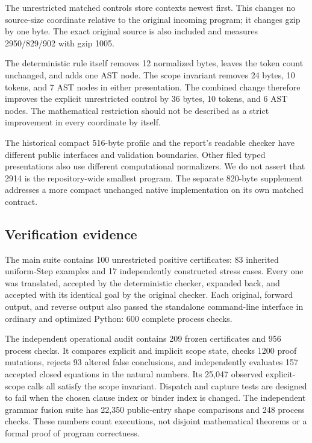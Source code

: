 \documentclass[11pt,letterpaper]{article}
\theoremstyle{definition}
\begin{document}

The unrestricted matched controls store contexts newest first. This
changes no source-size coordinate relative to the original incoming
program; it changes gzip by one byte. The exact original source is
also included and measures 2950/829/902 with gzip 1005.

The deterministic rule itself removes 12 normalized bytes, leaves the
token count unchanged, and adds one AST node. The scope invariant removes
24 bytes, 10 tokens, and 7 AST nodes in either presentation. The combined
change therefore improves the explicit unrestricted control by 36 bytes,
10 tokens, and 6 AST nodes. The mathematical restriction should not be
described as a strict improvement in every coordinate by itself.

The historical compact 516-byte profile and the report's readable
checker have different public interfaces and validation boundaries.
Other filed typed presentations also use different computational
normalizers. We do not assert that 2914 is the repository-wide smallest
program. The separate 820-byte supplement addresses a more compact
unchanged native implementation on its own matched contract.

\subsection{Verification evidence}

The main suite contains 100 unrestricted positive certificates: 83
inherited uniform-Step examples and 17 independently constructed stress
cases. Every one was translated, accepted by the deterministic checker,
expanded back, and accepted with its identical goal by the original
checker. Each original, forward output, and reverse output also passed
the standalone command-line interface in ordinary and optimized Python:
600 complete process checks.

The independent operational audit contains 209 frozen certificates and
956 process checks. It compares explicit and implicit scope state,
checks 1200 proof mutations, rejects 93 altered false conclusions,
and independently evaluates 157 accepted closed equations in the natural
numbers. Its 25,047 observed explicit-scope calls all satisfy the scope
invariant. Dispatch and capture tests are designed to fail when the
chosen clause index or binder index is changed. The independent grammar
fusion suite has 22,350 public-entry shape comparisons and 248 process
checks. These numbers count executions, not disjoint mathematical
theorems or a formal proof of program correctness.
\end{document}
